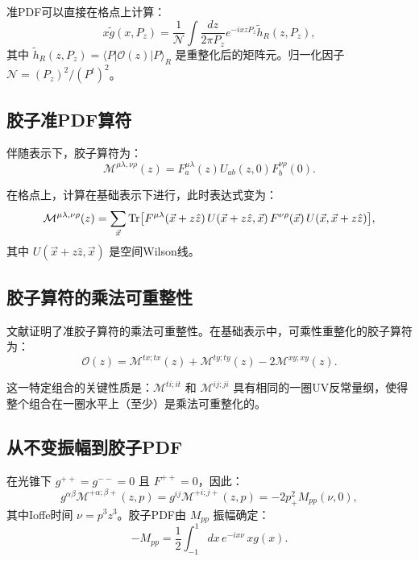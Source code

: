 \documentclass[11pt,a4paper]{article}
\providecommand{\Tr}{\text{Tr}}
\newcommand{\hR}{\tilde{h}_R}
\newcommand{\Pz}{P_z}
\begin{document}
准PDF可以直接在格点上计算：
\begin{equation}\label{eq:quasi-pdf}
    x\tilde{g}(x, \Pz) = \frac{1}{\mathcal{N}} \int \frac{dz}{2\pi\Pz} e^{-ixz\Pz} \hR(z, \Pz),
\end{equation}
其中 $\hR(z, \Pz) = \langle P | \mathcal{O}(z) | P \rangle_R$ 是重整化后的矩阵元。归一化因子 $\mathcal{N} = (\Pz)^2/(P^t)^2$。

\subsection{胶子准PDF算符}

伴随表示下，胶子算符为：
\begin{equation}\label{eq:M_adj}
    \mathcal{M}^{\mu\lambda,\nu\rho}(z) = F^{\mu\lambda}_a(z) U_{ab}(z,0) F^{\nu\rho}_b(0).
\end{equation}

在格点上，计算在基础表示下进行，此时表达式变为：
\begin{equation}\label{eq:M_fund}
    \mathcal{M}^{\mu\lambda,\nu\rho}(z) = \sum_{\vec{x}} \Tr\qty[F^{\mu\lambda}(\vec{x}+z\hat{z}) \, U(\vec{x}+z\hat{z}, \vec{x}) \, F^{\nu\rho}(\vec{x}) \, U(\vec{x}, \vec{x}+z\hat{z})],
\end{equation}
其中 $U(\vec{x}+z\hat{z}, \vec{x})$ 是空间Wilson线。

\subsection{胶子算符的乘法可重整性}

文献\cite{Li:2018uif}证明了准胶子算符的乘法可重整性。在基础表示中，可乘性重整化的胶子算符为\cite{Zhang:2018diw,Balitsky:2019krj}：
\begin{equation}\label{eq:O_mult}
    \mathcal{O}(z) = \mathcal{M}^{tx;tx}(z) + \mathcal{M}^{ty;ty}(z) - 2\mathcal{M}^{xy;xy}(z).
\end{equation}

这一特定组合的关键性质是：$\mathcal{M}^{ti;it}$ 和 $\mathcal{M}^{ij;ji}$ 具有相同的一圈UV反常量纲，使得整个组合在一圈水平上（至少）是乘法可重整化的。

\subsection{从不变振幅到胶子PDF}

在光锥下 $g^{++} = g^{--} = 0$ 且 $F^{++} = 0$，因此：
\begin{equation}
    g^{\alpha\beta} \mathcal{M}^{+\alpha;\beta+}(z,p) = g^{ij} \mathcal{M}^{+i;j+}(z,p) = -2p^2_+ M_{pp}(\nu, 0),
\end{equation}
其中Ioffe时间 $\nu = p^3 z^3$。胶子PDF由 $M_{pp}$ 振幅确定：
\begin{equation}\label{eq:Mpp_PDF}
    -M_{pp} = \frac{1}{2} \int_{-1}^{1} dx \, e^{-ix\nu} \, x g(x).
\end{equation}
\end{document}
